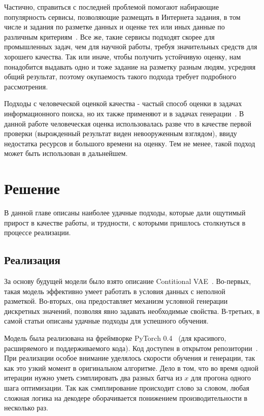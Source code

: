 \documentclass{spbau-diploma}
\begin{document}
Частично, справиться с последней проблемой помогают набирающие популярность 
сервисы, позволяющие размещать в Интернета задания, в том числе и задания по
разметке данных и оценке тех или иных данные по различным
критериям~\cite{yatoloka, mturk}. Все же, такие сервисы подходят скорее для 
промышленных задач, чем для научной работы, требуя значительных средств для 
хорошего качества. Так или иначе, чтобы получить устойчивую оценку, нам 
понадобится выдавать одно и тоже задание на разметку разным людям, усредняя
общий результат, поэтому окупаемость такого подхода требует подробного 
рассмотрения.

Подходы с человеческой оценкой качества - частый способ оценки в задачах 
информационного поиска, но их также применяют и в задачах 
генерации~\cite{1606.03498}. В данной работе человеческая оценка 
использовалась разве что в качестве первой проверки (вырожденный результат 
виден невооруженным взглядом), ввиду недостатка ресурсов и большого времени на 
оценку. Тем не менее, такой подход может быть использован в дальнейшем.

\section{Решение}
В данной главе описаны наиболее удачные подходы, которые дали ощутимый прирост в 
качестве работы, и трудности, с которыми пришлось столкнуться в процессе 
реализации.

\subsection{Реализация}
За основу будущей модели было взято описание Contitional VAE~\cite{text_cvae}. 
Во-первых, такая модель эффективно умеет работать в 
условия данных с неполной разметкой. Во-вторых, она предоставляет механизм
условной генерации дискретных значений, позволяя явно задавать необходимые 
свойства. В-третьих, в самой статьи описаны удачные подходы для успешного 
обучения.

Модель была реализована на фреймворке PyTorch 0.4~\cite{pytorch} (для 
красивого, расширяемого и поддерживаемого кода). Код доступен в открытом 
репозитории~\cite{github}. При реализации особое внимание уделялось скорости 
обучения и генерации, так как это узкий момент в оригинальном алгоритме. 
Дело в том, что во время одной итерации
нужно уметь сэмплировать два разных батча из $x$ для прогона одного шага 
оптимизации. Так как сэмплирование происходит слово за словом, любая сложная 
логика на декодере оборачивается понижением производительности в несколько 
раз.
\end{document}

